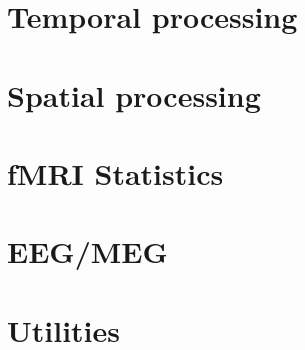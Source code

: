 \documentclass[a4paper,titlepage]{book}
\begin{document}
\dominitoc\tableofcontents

\newpage



%


\part{Temporal processing}




\part{Spatial processing}









\part{fMRI Statistics}



%


\part{EEG/MEG}


%







\part{Utilities}




%




\end{document}
